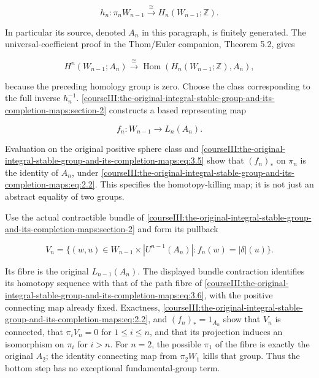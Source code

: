 \begin{equation}
h_n:\pi_nW_{n-1}\xrightarrow{\cong}H_n(W_{n-1};\mathbb Z).
 \label{courseIII:the-original-integral-stable-group-and-its-completion-maps:eq:3.4}
\end{equation}

In particular its source, denoted \(A_n\) in this paragraph, is finitely generated. The universal-coefficient proof in the Thom/Euler companion, Theorem 5.2, gives

\begin{equation}
H^n(W_{n-1};A_n)
 \xrightarrow{\cong}
 \operatorname{Hom}(H_n(W_{n-1};\mathbb Z),A_n),
 \label{courseIII:the-original-integral-stable-group-and-its-completion-maps:eq:3.5}
\end{equation}

because the preceding homology group is zero. Choose the class corresponding to the full inverse \(h_n^{-1}\). \cref{courseIII:the-original-integral-stable-group-and-its-completion-maps:section-2} constructs a based representing map

\begin{equation}
f_n:W_{n-1}\longrightarrow L_n(A_n).
 \label{courseIII:the-original-integral-stable-group-and-its-completion-maps:eq:3.6}
\end{equation}

Evaluation on the original positive sphere class and \eqref{courseIII:the-original-integral-stable-group-and-its-completion-maps:eq:3.5} show that \((f_n)_*\) on \(\pi_n\) is the identity of \(A_n\), under \eqref{courseIII:the-original-integral-stable-group-and-its-completion-maps:eq:2.2}. This specifies the homotopy-killing map; it is not just an abstract equality of two groups.

Use the actual contractible bundle of \cref{courseIII:the-original-integral-stable-group-and-its-completion-maps:section-2} and form its pullback

\begin{equation}
V_n=\{(w,u)\in W_{n-1}\times|U^{n-1}(A_n)|:
                 f_n(w)=|\delta|(u)\}.
 \label{courseIII:the-original-integral-stable-group-and-its-completion-maps:eq:3.7}
\end{equation}

Its fibre is the original \(L_{n-1}(A_n)\). The displayed bundle contraction identifies its homotopy sequence with that of the path fibre of \eqref{courseIII:the-original-integral-stable-group-and-its-completion-maps:eq:3.6}, with the positive connecting map already fixed. Exactness, \eqref{courseIII:the-original-integral-stable-group-and-its-completion-maps:eq:2.2}, and \((f_n)_*=1_{A_n}\) show that \(V_n\) is connected, that \(\pi_iV_n=0\) for \(1\leq i\leq n\), and that its projection induces an isomorphism on \(\pi_i\) for \(i>n\). For \(n=2\), the possible \(\pi_1\) of the fibre is exactly the original \(A_2\); the identity connecting map from \(\pi_2W_1\) kills that group. Thus the bottom step has no exceptional fundamental-group term.

